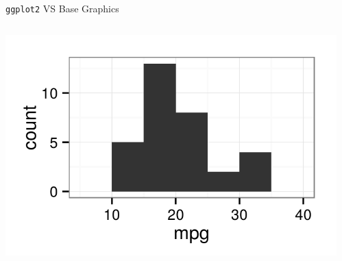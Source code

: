 \documentclass[table,smaller]{beamer}
\begin{document}
\begin{frame}[fragile,label=sec-1-8]{\texttt{ggplot2} VS Base Graphics}
\begin{columns}
\begin{column}{0.5\textwidth}
\begin{columns}
\begin{block}{}
\includegraphics[width=.9\linewidth]{images/ggplotHist1.png}
\end{block} \end{columns}
\end{column}

\begin{column}{1.0\textwidth}

\end{column}
\end{columns}
\end{frame}
\end{document}

